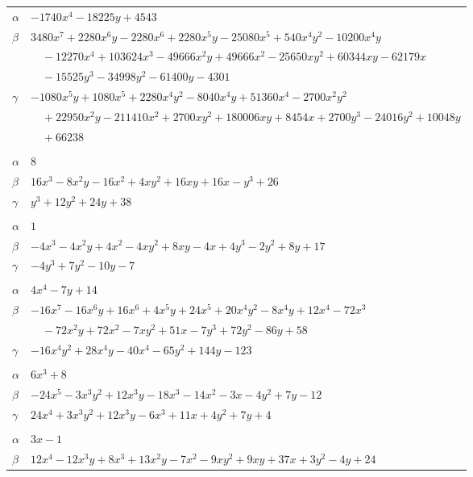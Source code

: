 \documentclass[11pt]{article}
\begin{document}
\begin{longtable}{@{}ll@{}}
$\alpha$ & $-1740x^{4}-18225y+4543$\\
$\beta$ & $3480x^{7}+2280x^{6}y-2280x^{6}+2280x^{5}y-25080x^{5}+540x^{4}y^{2}-10200x^{4}y$\\
 & $\quad -12270x^{4}+103624x^{3}-49666x^{2}y+49666x^{2}-25650xy^{2}+60344xy-62179x$\\
 & $\quad -15525y^{3}-34998y^{2}-61400y-4301$\\
$\gamma$ & $-1080x^{5}y+1080x^{5}+2280x^{4}y^{2}-8040x^{4}y+51360x^{4}-2700x^{2}y^{2}$\\
 & $\quad +22950x^{2}y-211410x^{2}+2700xy^{2}+180006xy+8454x+2700y^{3}-24016y^{2}+10048y$\\
 & $\quad +66238$\\
\addlinespace[3pt]
\multicolumn{2}{@{}l}{$\{i,j\}=\{4,6\}$, $k_{ij}=2^{5}$}\\
$\alpha$ & $8$\\
$\beta$ & $16x^{3}-8x^{2}y-16x^{2}+4xy^{2}+16xy+16x-y^{3}+26$\\
$\gamma$ & $y^{3}+12y^{2}+24y+38$\\
\addlinespace[3pt]
\multicolumn{2}{@{}l}{$\{i,j\}=\{1,13\}$, $k_{ij}=2\cdot 3^{2}$}\\
$\alpha$ & $1$\\
$\beta$ & $-4x^{3}-4x^{2}y+4x^{2}-4xy^{2}+8xy-4x+4y^{3}-2y^{2}+8y+17$\\
$\gamma$ & $-4y^{3}+7y^{2}-10y-7$\\
\addlinespace[3pt]
\multicolumn{2}{@{}l}{$\{i,j\}=\{1,19\}$, $k_{ij}=2^{3}\cdot 3^{2}$}\\
$\alpha$ & $4x^{4}-7y+14$\\
$\beta$ & $-16x^{7}-16x^{6}y+16x^{6}+4x^{5}y+24x^{5}+20x^{4}y^{2}-8x^{4}y+12x^{4}-72x^{3}$\\
 & $\quad -72x^{2}y+72x^{2}-7xy^{2}+51x-7y^{3}+72y^{2}-86y+58$\\
$\gamma$ & $-16x^{4}y^{2}+28x^{4}y-40x^{4}-65y^{2}+144y-123$\\
\addlinespace[3pt]
\multicolumn{2}{@{}l}{$\{i,j\}=\{7,19\}$, $k_{ij}=2^{3}$}\\
$\alpha$ & $6x^{3}+8$\\
$\beta$ & $-24x^{5}-3x^{3}y^{2}+12x^{3}y-18x^{3}-14x^{2}-3x-4y^{2}+7y-12$\\
$\gamma$ & $24x^{4}+3x^{3}y^{2}+12x^{3}y-6x^{3}+11x+4y^{2}+7y+4$\\
\addlinespace[3pt]
\multicolumn{2}{@{}l}{$\{i,j\}=\{12,18\}$, $k_{ij}=2^{6}$}\\
$\alpha$ & $3x-1$\\
$\beta$ & $12x^{4}-12x^{3}y+8x^{3}+13x^{2}y-7x^{2}-9xy^{2}+9xy+37x+3y^{2}-4y+24$\\

\end{longtable}
\end{document}

